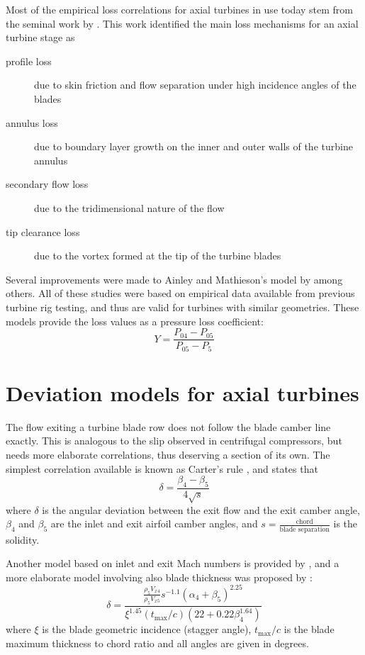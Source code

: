 Most of the empirical loss correlations for axial turbines in use today stem from the seminal work by \textcite{Ainley1951}. This work identified the main loss mechanisms for an axial turbine stage as 
\begin{description}
    \item[profile loss] due to skin friction and flow separation under high incidence angles of the blades
    \item[annulus loss] due to boundary layer growth on the inner and outer walls of the turbine annulus
    \item[secondary flow loss] due to the tridimensional nature of the flow
    \item[tip clearance loss] due to the vortex formed at the tip of the turbine blades
\end{description}

Several improvements were made to Ainley and Mathieson's model by \textcite{Mukhtarov1969, Dunham1970, Kacker1982, Moustapha1989, Benner1995} among others\cite{Persson2015}. All of these studies were based on empirical data available from previous turbine rig testing, and thus are valid for turbines with similar geometries.
These models provide the loss values as a pressure loss coefficient:
\begin{equation}
    Y = \frac{P_{04}-P_{05}}{P_{05}-P_5}
\end{equation}

\section{Deviation models for axial turbines}

The flow exiting a turbine blade row does not follow the blade camber line exactly. 
This is analogous to the slip observed in centrifugal compressors, but needs more elaborate correlations, 
thus deserving a section of its own. 
The simplest correlation available is known as Carter's rule \cite{Mattingly1996}, and states that
\begin{equation}
    \label{eqn:cartersrule}
    \delta = \frac{\beta_4-\beta_5}{4\sqrt{s}}
\end{equation}
where $\delta$ is the angular deviation between the exit flow and the exit camber angle,
$\beta_4$ and $\beta_5$ are the inlet and exit airfoil camber angles,
and $s=\frac{\text{chord}}{\text{blade separation}}$ is the solidity.

Another model based on inlet and exit Mach numbers is provided by \textcite{Ainley1951}, 
and a more elaborate model involving also blade thickness was proposed by \textcite{Islam1999}:
\begin{equation}
    \delta = \frac{\frac{\rho_5 V_{x4}}{\rho_5 V_{x5}} s^{-1.1} (\alpha_4+\beta_5)^{2.25}}
                        {\xi^{1.45} \left(t_{\max}/c\right) \left(22+0.22\beta_4^{1.64}\right)}
\end{equation}
where $\xi$ is the blade geometric incidence (stagger angle), 
$t_{\max}/c$ is the blade maximum thickness to chord ratio 
and all angles are given in degrees.

